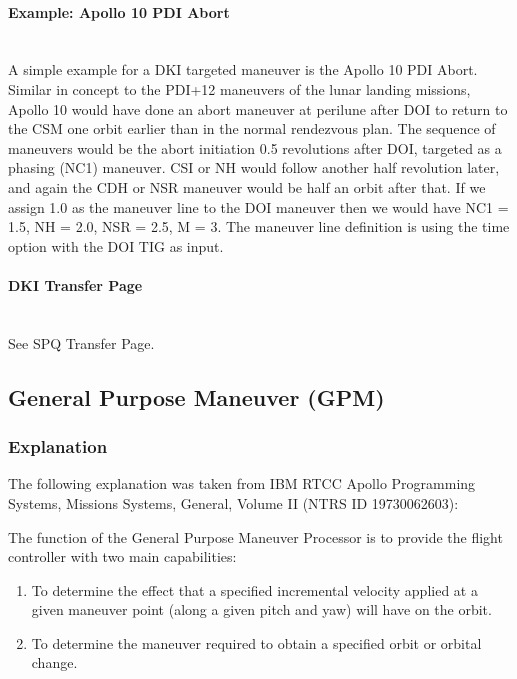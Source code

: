 \documentclass[11pt]{article} %
\begin{document}
\paragraph{Example: Apollo 10 PDI Abort}\mbox{} \\

A simple example for a DKI targeted maneuver is the Apollo 10 PDI Abort. Similar in concept to the PDI+12 maneuvers of the lunar landing missions, Apollo 10 would have done an abort maneuver at perilune after DOI to return to the CSM one orbit earlier than in the normal rendezvous plan. The sequence of maneuvers would be the abort initiation 0.5 revolutions after DOI, targeted as a phasing (NC1) maneuver. CSI or NH would follow another half revolution later, and again the CDH or NSR maneuver would be half an orbit after that. If we assign 1.0 as the maneuver line to the DOI maneuver then we would have NC1 = 1.5, NH = 2.0, NSR = 2.5, M = 3. The maneuver line definition is using the time option with the DOI TIG as input.
\newpage
\paragraph{DKI Transfer Page}\mbox{} \\

See SPQ Transfer Page.
\newpage
\subsection{General Purpose Maneuver (GPM)}

\subsubsection{Explanation}

The following explanation was taken from IBM RTCC Apollo Programming Systems, Missions Systems, General, Volume II (NTRS ID 19730062603):

The function of the General Purpose Maneuver Processor is to provide the flight controller with two main capabilities:

\begin{enumerate}
	\item To determine the effect that a specified incremental velocity applied at a given maneuver point (along a given pitch and yaw) will have on the orbit.
	\item To determine the maneuver required to obtain a specified orbit or orbital change.
\end{enumerate}
\end{document}
